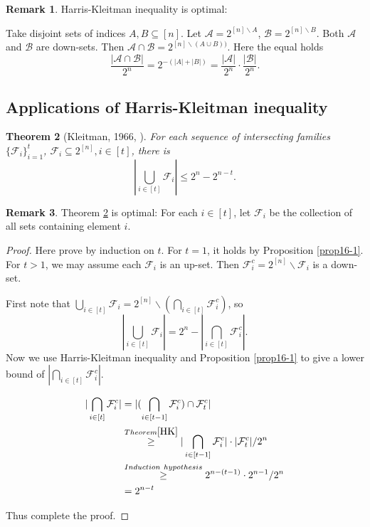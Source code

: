 \documentclass{article}
\newtheorem{theorem}{Theorem}[section]
\theoremstyle{definition}
\newtheorem{remark}[theorem]{Remark}
\begin{document}
\begin{remark}
    Harris-Kleitman inequality is optimal:
    
    Take disjoint sets of indices $A, B \subseteq [n]$. Let $\mathcal{A} = 2^{[n]\backslash A}$, $\mathcal{B} = 2^{[n]\backslash B}$. Both $\mathcal{A}$ and $\mathcal{B}$ are down-sets. Then $\mathcal{A} \cap \mathcal{B} = 2^{[n]\backslash (A\cup B))}$. Here the equal holds $$\frac{|\mathcal{A} \cap \mathcal{B}|}{2^n} = 2^{-(|A|+|B|)} = \frac{|\mathcal{A}|}{2^n} \cdot \frac{|\mathcal{B}|}{2^n}.$$
\end{remark}

\subsection{Applications of Harris-Kleitman inequality}
\begin{theorem}[Kleitman, 1966, \cite{KLEITMAN1966153}]\label{K1}
    For each sequence of intersecting families $\{\mathcal{F}_i \}_{i=1}^t$, $\mathcal{F}_i \subseteq 2^{[n]}, i\in [t]$, there is $$|\bigcup_{i \in [t]}\mathcal{F}_i| \leq 2^n - 2^{n-t}.$$
\end{theorem}
\begin{remark}
    Theorem \ref{K1} is optimal: For each $i\in [t]$, let $\mathcal{F}_i$ be the collection of all sets containing element $i$.
\end{remark}
\begin{proof}
    Here prove by induction on $t$. For $t=1$, it holds by Proposition \ref{prop16-1}.
    For $t >1$, we may assume each $\mathcal{F}_i$ is an up-set. Then $\mathcal{F}_i^c = 2^{[n]} \backslash \mathcal{F}_i$ is a down-set. 
    
    First note that $\bigcup_{i \in [t]}\mathcal{F}_i = 2^{[n]} \backslash (\bigcap_{i \in [t]}\mathcal{F}_i^c)$, so $$|\bigcup_{i \in [t]}\mathcal{F}_i| = 2^n - |\bigcap_{i \in [t]}\mathcal{F}_i^c|.$$
    Now we use Harris-Kleitman inequality and Proposition \ref{prop16-1} to give a lower bound of $|\bigcap_{i \in [t]}\mathcal{F}_i^c|$.

    \begin{equation}
        \begin{split}
            |\bigcap_{i \in [t]}\mathcal{F}_i^c| & = |(\bigcap_{i \in [t-1]}\mathcal{F}_i^c) \cap \mathcal{F}_t^c|\\
            & \overset{Theorem \ref{HK}}{\geq} |\bigcap_{i \in [t-1]}\mathcal{F}_i^c|\cdot |\mathcal{F}_t^c|/ 2^n\\
            & \overset{Induction\ hypothesis}{\geq} 2^{n-(t-1)}\cdot 2^{n-1}/ 2^n\\
            & = 2^{n-t}
        \end{split}
    \end{equation}

    Thus complete the proof.
\end{proof}
\end{document}
